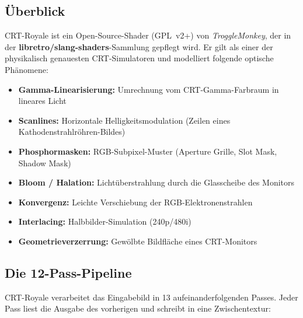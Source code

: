 \documentclass[11pt, a4paper]{article}
\begin{document}
\subsection{\"Uberblick}
\vspace{.5cm}
CRT-Royale ist ein Open-Source-Shader (GPL~v2+) von \textit{TroggleMonkey}, \newline der in der \textbf{libretro/slang-shaders}-Sammlung gepflegt wird. \newline Er gilt als einer der physikalisch genauesten CRT-Simulatoren \newline und modelliert folgende optische Ph\"anomene: \vspace{.5cm}

\begin{itemize}[leftmargin=*, nosep]
    \item \textbf{Gamma-Linearisierung:} Umrechnung vom CRT-Gamma-Farbraum in lineares Licht \\
    \item \textbf{Scanlines:} Horizontale Helligkeitsmodulation (Zeilen eines Kathodenstrahlr\"ohren-Bildes) \\
    \item \textbf{Phosphormasken:} RGB-Subpixel-Muster (Aperture Grille, Slot Mask, Shadow Mask) \\
    \item \textbf{Bloom / Halation:} Licht\"uberstrahlung durch die Glasscheibe des Monitors \\
    \item \textbf{Konvergenz:} Leichte Verschiebung der RGB-Elektronenstrahlen \\
    \item \textbf{Interlacing:} Halbbilder-Simulation (240p/480i) \\
    \item \textbf{Geometrieverzerrung:} Gew\"olbte Bildfl\"ache eines CRT-Monitors
\end{itemize}
\newpage \vspace*{-.5cm}
\subsection{Die 12-Pass-Pipeline}
\vspace{.5cm}
CRT-Royale verarbeitet das Eingabebild in 13 aufeinanderfolgenden Passes. Jeder Pass liest die Ausgabe des vorherigen und schreibt in eine Zwischentextur: \vspace{.25cm}
\end{document}
